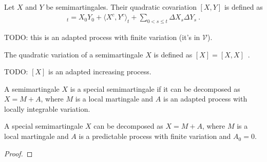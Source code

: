 \begin{definition}\label{def:quadCovariation}
Let $X$ and $Y$ be semimartingales. Their quadratic covariation $[X, Y]$ is defined as
\begin{align*}
  [X, Y]_t = X_0 Y_0 + \langle X^c, Y^c \rangle_t + \sum_{0 < s \le t} \Delta X_s \Delta Y_s
  \: .
\end{align*}
\end{definition}

TODO: this is an adapted process with finite variation (it's in $\mathcal{V}$).


\begin{definition}\label{def:quadVariation}
The quadratic variation of a semimartingale $X$ is defined as $[X] = [X, X]$~.
\end{definition}

TODO: $[X]$ is an adapted increasing process.


\begin{definition}\label{def:IsSpecialSemimartingale}
A semimartingale $X$ is a special semimartingale if it can be decomposed as $X = M + A$, where $M$ is a local martingale and $A$ is an adapted process with locally integrable variation.
\end{definition}


\begin{theorem}\label{lem:IsSpecialSemimartingale.decomposition}
A special semimartingale $X$ can be decomposed as $X = M + A$, where $M$ is a local martingale and $A$ is a predictable process with finite variation and $A_0 = 0$.
\end{theorem}

\begin{proof}

\end{proof}
